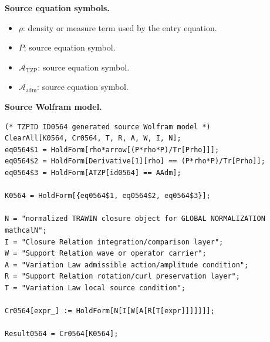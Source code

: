 \begin{minipage}[t]{0.49\linewidth}
\begingroup
\small
\raggedright
\textbf{Source equation symbols.}\par
\begin{itemize}[leftmargin=1.35em,itemsep=1pt,topsep=1pt,parsep=0pt]
    \item $\rho$: density or measure term used by the entry equation.
    \item $P$: source equation symbol.
    \item $\mathcal{A}_{\mathrm{TZP}}$: source equation symbol.
    \item $\mathcal{A}_{\mathrm{adm}}$: source equation symbol.
\end{itemize}
\endgroup
\end{minipage}\hfill
\begin{minipage}[t]{0.47\linewidth}
\begingroup
\scriptsize
\raggedright
\textbf{Source Wolfram model.}\par
\begin{Verbatim}[fontsize=\tiny,breaklines=true,breakanywhere=true]
(* TZPID ID0564 generated source Wolfram model *)
ClearAll[K0564, Cr0564, T, R, A, W, I, N];
eq0564$1 = HoldForm[rho*arrow[(P*rho*P)/Tr[Prho]]];
eq0564$2 = HoldForm[Derivative[1][rho] == (P*rho*P)/Tr[Prho]];
eq0564$3 = HoldForm[ATZP[id0564] == AAdm];

K0564 = HoldForm[{eq0564$1, eq0564$2, eq0564$3}];

N = "normalized TRAWIN closure object for GLOBAL NORMALIZATION mathcalN";
I = "Closure Relation integration/comparison layer";
W = "Support Relation wave or operator carrier";
A = "Variation Law admissible action/amplitude condition";
R = "Support Relation rotation/curl preservation layer";
T = "Variation Law local source condition";

Cr0564[expr_] := HoldForm[N[I[W[A[R[T[expr]]]]]]];

Result0564 = Cr0564[K0564];
\end{Verbatim}
\endgroup
\end{minipage}

